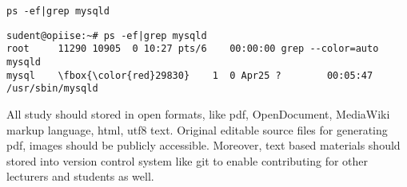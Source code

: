 \begin{verbatim}
ps -ef|grep mysqld
\end{verbatim}
\label{code_sample}
%
\small{
\begin{Verbatim}[samepage=true,frame=single,
label=Command output,framesep=2mm,rulecolor=\color{red},commandchars=\\\{\}]
sudent@opiise:~# ps -ef|grep mysqld
root     11290 10905  0 10:27 pts/6    00:00:00 grep --color=auto mysqld
mysql    \fbox{\color{red}29830}    1  0 Apr25 ?        00:05:47 /usr/sbin/mysqld
\end{Verbatim}
%
}

All study should stored in open formats, like pdf, OpenDocument, MediaWiki markup language, html, utf8 text. Original editable source files for generating pdf, images should be publicly accessible. Moreover, text based materials should stored into version control system like \gls{git} to enable contributing for other lecturers and students as well.

%
%
%
%
%
%
%
%
%
%
%
%
%
%



